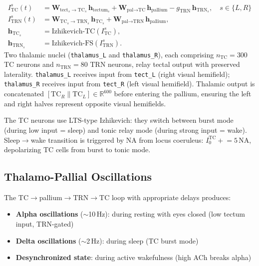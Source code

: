 \documentclass[11pt,a4paper]{article}
\begin{document}
\begin{equation}\label{eq:thalamus}
\boxed{
\begin{aligned}
  I_{\text{TC}}^{s}(t) &= \mathbf{W}_{\text{tect}_{s}\to \text{TC}_{s}}\,\mathbf{h}_{\text{tectum}_{s}}
    + \mathbf{W}_{\text{pal}\to \text{TC}}\,\mathbf{h}_{\text{pallium}}
    - g_\text{TRN}\,\mathbf{h}_{\text{TRN}_{s}}, \quad s \in \{L, R\} \\
  I_{\text{TRN}}^{s}(t) &= \mathbf{W}_{\text{TC}_{s}\to \text{TRN}_{s}}\,\mathbf{h}_{\text{TC}_{s}}
    + \mathbf{W}_{\text{pal}\to \text{TRN}}\,\mathbf{h}_{\text{pallium}}, \\
  \mathbf{h}_{\text{TC}_{s}} &= \text{Izhikevich-TC}(I_{\text{TC}}^{s}), \\
  \mathbf{h}_{\text{TRN}_{s}} &= \text{Izhikevich-FS}(I_{\text{TRN}}^{s}).
\end{aligned}
}
\end{equation}
Two thalamic nuclei (\texttt{thalamus\_L} and \texttt{thalamus\_R}), each comprising $n_\text{TC}=300$ TC neurons and $n_\text{TRN}=80$ TRN neurons, relay tectal output with preserved laterality. \texttt{thalamus\_L} receives input from \texttt{tect\_L} (right visual hemifield); \texttt{thalamus\_R} receives input from \texttt{tect\_R} (left visual hemifield). Thalamic output is concatenated $[\text{TC}_R \| \text{TC}_L] \in \mathbb{R}^{600}$ before entering the pallium, ensuring the left and right halves represent opposite visual hemifields.

The TC neurons use LTS-type Izhikevich: they switch between burst mode
(during low input = sleep) and tonic relay mode (during strong input = wake).
Sleep$\to$wake transition is triggered by NA from locus coeruleus:
$I_0^\text{TC} \mathrel{+}= 5\,\text{NA}$, depolarizing TC cells from burst to tonic mode.

\subsection{Thalamo-Pallial Oscillations}

The TC$\to$pallium$\to$TRN$\to$TC loop with appropriate delays produces:
\begin{itemize}[nosep]
  \item \textbf{Alpha oscillations} ($\sim$10\,Hz): during resting with eyes closed
    (low tectum input, TRN-gated)
  \item \textbf{Delta oscillations} ($\sim$2\,Hz): during sleep (TC burst mode)
  \item \textbf{Desynchronized state}: during active wakefulness (high ACh breaks alpha)
\end{itemize}
\end{document}

